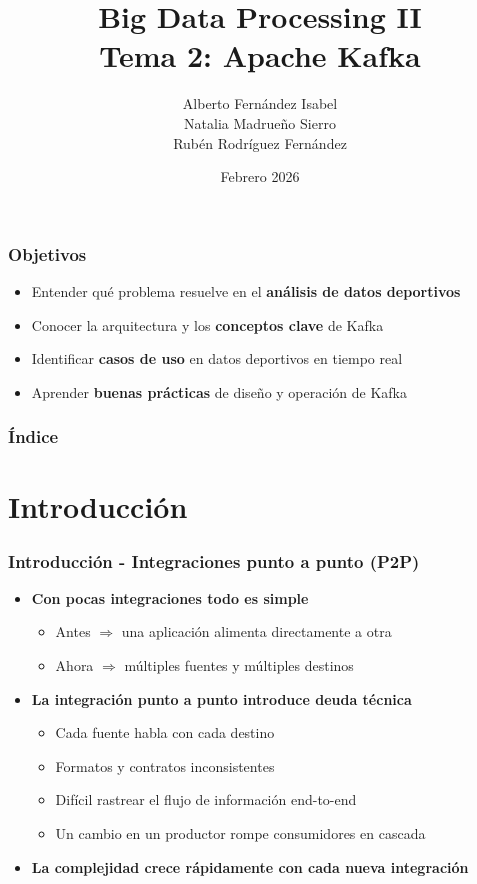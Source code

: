 \documentclass[aspectratio=169]{beamer}
\institute[URJC]{DSLAB}
\author[Big Data Processing II]{
	Alberto Fernández Isabel \\
	Natalia Madrueño Sierro \\
	Rubén Rodríguez Fernández \\
}
\title[Tema 2: Apache Kafka]{
	Big Data Processing II \\ \vspace{0.2em}
	\large{Tema 2: Apache Kafka}
}
\date{Febrero 2026}
\begin{document}
\begin{frame}
  \titlepage
\end{frame}

\begin{frame}
\frametitle{Objetivos}
	\begin{itemize}
    \item Entender qué problema resuelve en el \textbf{análisis de datos deportivos}
    \item Conocer la arquitectura y los \textbf{conceptos clave} de Kafka
    \item Identificar \textbf{casos de uso} en datos deportivos en tiempo real
    \item Aprender \textbf{buenas prácticas} de diseño y operación de Kafka
	\end{itemize}
\end{frame}


\begin{frame}
\frametitle{Índice}
	\tableofcontents
\end{frame}

\section{Introducción}

\begin{frame}\frametitle{Introducción - Integraciones punto a punto (P2P)}
	\begin{itemize}
		\item \textbf{Con pocas integraciones todo es simple}
		\begin{itemize}
			\item Antes $\Rightarrow$ una aplicación alimenta directamente a otra
			\item Ahora $\Rightarrow$ múltiples fuentes y múltiples destinos
		\end{itemize}

		\vspace{1em}

		\item \textbf{La integración punto a punto introduce deuda técnica}
		\begin{itemize}
      \item Cada fuente habla con cada destino
			\item Formatos y contratos inconsistentes
			\item Difícil rastrear el flujo de información end-to-end
			\item Un cambio en un productor rompe consumidores en cascada
		\end{itemize}

    \vspace{1em}
  
    \item \textbf{La complejidad crece rápidamente con cada nueva integración}
	\end{itemize}
\end{frame}
\end{document}
